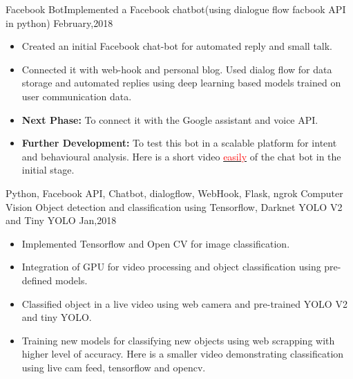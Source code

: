 %
%
%
\begin{experiences}
  \experience
    {Facebook Bot}{Implemented a Facebook chatbot}{(using dialogue flow }{facbook API in python)}
    {February,2018} {
                      \begin{itemize}
                        \item Created an initial Facebook chat-bot for automated reply and small talk.
                        \item Connected it with web-hook and personal blog. Used dialog flow for data storage and automated replies using deep learning based models trained on user communication data. 
                        \item \textbf{Next Phase:} To connect it with the Google assistant and voice API.
                        \item \textbf{Further Development:} To test this bot in a scalable platform for intent and behavioural analysis. Here is a short video \href{http://www.nouvo.ch/s-007}{\textcolor{red}{easily}} of the chat bot in the initial stage.
                      \end{itemize}
                    }
                    {Python, Facebook API, Chatbot, dialogflow, WebHook, Flask, ngrok}
  \emptySeparator
  \experience
    {Computer Vision} {Object detection and classification using Tensorflow, Darknet }{YOLO V2}{ and Tiny YOLO}
    {Jan,2018}    {
                      \begin{itemize}
                        \item Implemented Tensorflow and Open CV for image classification.                           
                        \item Integration of GPU for video processing and object classification using pre-defined models.  
                        
                        \item Classified object in a live video using web camera and pre-trained YOLO V2 and tiny YOLO.
                        
                        \item Training new models for classifying new objects using web scrapping with higher level of accuracy. Here is a smaller video demonstrating classification using live cam feed, tensorflow and opencv.
                                                              

\end{itemize}}
\end{experiences}
